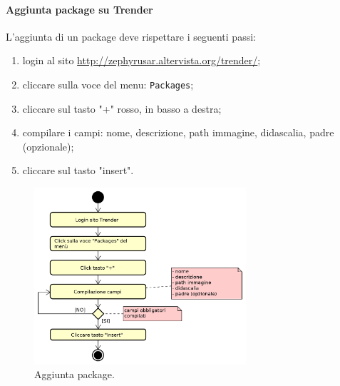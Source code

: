 		\paragraph{Aggiunta package su Trender} \label{sec:traccComp}
		L'aggiunta di un package deve rispettare i seguenti passi:
		\begin{enumerate}
			\item login al sito \url{http://zephyrusar.altervista.org/trender/};
			\item cliccare sulla voce del menu: \texttt{Packages};
			\item cliccare sul tasto "+" rosso, in basso a destra;
			\item compilare i campi: nome, descrizione, path immagine, didascalia, padre (opzionale);
			\item cliccare sul tasto "insert".
		\end{enumerate}
		\begin{figure}[H]
			\centering
			\includegraphics[width=0.7\textwidth]{img/AggiuntaPack}
			\caption{Aggiunta package.}
		\end{figure}
		

